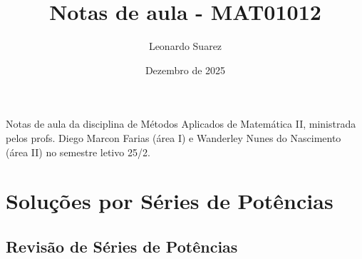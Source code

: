 \documentclass{article}
\title{Notas de aula - MAT01012}
\author{Leonardo Suarez}
\date{Dezembro de 2025}
\begin{document}
\maketitle

Notas de aula da disciplina de Métodos Aplicados de Matemática II, ministrada pelos profs. Diego Marcon Farias (área I) e Wanderley Nunes do Nascimento (área II) no semestre letivo 25/2.

\tableofcontents

\section{Soluções por Séries de Potências}

\subsection{Revisão de Séries de Potências}
\end{document}
